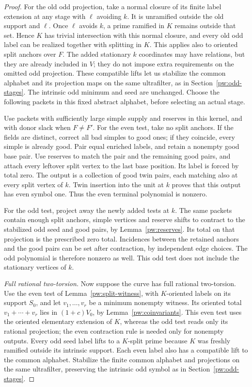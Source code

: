 \begin{proof}
For the old odd projection, take a normal closure of its finite label
extension at any stage with $\ell$ avoiding $k$.  It is unramified outside
the old support and $\ell$.  Once $\ell$ avoids
$k$, a prime ramified in $K$ remains outside that set.  Hence $K$
has trivial intersection with this normal closure, and every old odd
label can be realized together with splitting in $K$.  This applies
also to oriented split anchors over $F$.  The added stationary $k$
coordinates may have relations, but they are already included in $V$;
they do not impose extra requirements on the omitted odd projection.
These compatible lifts let us stabilize the common alphabet and its
projection maps on the same ultrafilter, as in Section~\ref{pw:odd-stages}.
The intrinsic odd minimum and seed are unchanged.  Choose the following
packets in this fixed abstract alphabet, before selecting an actual stage.

Use packets with sufficiently large simple supply and reserves in this
kernel, and with donor slack when \(F\ne F'\).  For the even test, take
no split anchors.  If the fields are distinct, correct all bad simples
to good ones; if they coincide, every simple is already good.  Pair
equal enriched labels, and
retain a nonempty good base pair.  Use reserves to match the pair and
the remaining good pairs, and attach every leftover split vertex to the
last base position.  Its label is forced by total zero.  The output is
a collection of good twin pairs, each matching also at every split
vertex of $k$.  Twin insertion into the unit at $k$ proves that this
output has even symbol one.  Thus the even terminal polynomial is
nonzero.

For the odd test, project away the newly added tests at $k$.  The same
packets contain enough split anchors, simple vertices and reserve shifts
to contract to the stabilized odd seed and good pairs, by
Lemma~\ref{pw:reserves}.  Its total on that projection is the prescribed
zero total.  Incidences between the retained anchors and the good pairs
can be set after contraction, by independent edge choices.  The odd
polynomial is therefore nonzero as well.  This odd test does not include
the stationary vertices of $k$.

\emph{Full rational two-torsion.}
Now suppose the curve has full rational two-torsion.  Use the even test
of Lemma~\ref{pw:split-witness}, with $K$-oriented labels on its support
$S_0$, and let $v_1,\ldots,v_r$ be a minimum nonempty witness.  Its
oriented total $v_1+\cdots+v_r$ lies in $(1+c)V_0$, by
Lemma~\ref{pw:coinvariants}.  This even test uses the oriented elementary
extension of $K$, whereas the odd test reads only its rational projection;
the even contraction rule is needed only for nonempty outputs.
Every odd seed label lifts to a $K$-split prime because $K$ was freshly
ramified outside its intrinsic support.  Each even label also has a
compatible lift to the common alphabet.  Stabilize the finite common
alphabet and projections on the same ultrafilter, preserving the
intrinsic odd symbol as in Section~\ref{pw:odd-stages}.


\end{proof}
